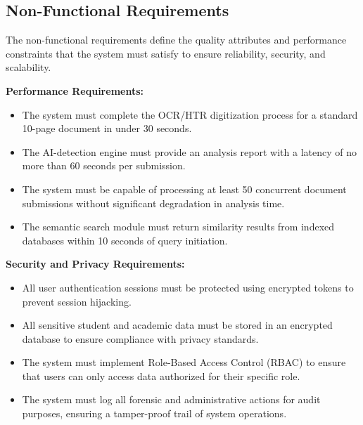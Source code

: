 \documentclass[12pt, a4paper]{report}
\numberwithin{equation}{chapter}
\begin{document}
\subsection{Non-Functional Requirements}

The non-functional requirements define the quality attributes and performance constraints that the system must satisfy to ensure reliability, security, and scalability.

\textbf{Performance Requirements:}

\begin{itemize}

\item The system must complete the OCR/HTR digitization process for a standard 10-page document in under 30 seconds.

\item The AI-detection engine must provide an analysis report with a latency of no more than 60 seconds per submission.

\item The system must be capable of processing at least 50 concurrent document submissions without significant degradation in analysis time.

\item The semantic search module must return similarity results from indexed databases within 10 seconds of query initiation.

\end{itemize}

\textbf{Security and Privacy Requirements:}

\begin{itemize}

\item All user authentication sessions must be protected using encrypted tokens to prevent session hijacking.

\item All sensitive student and academic data must be stored in an encrypted database to ensure compliance with privacy standards.

\item The system must implement Role-Based Access Control (RBAC) to ensure that users can only access data authorized for their specific role.

\item The system must log all forensic and administrative actions for audit purposes, ensuring a tamper-proof trail of system operations.

\end{itemize}
\end{document}
